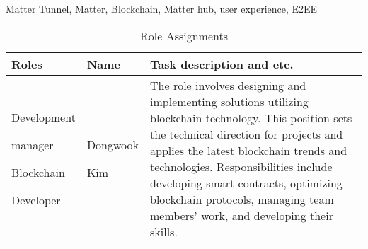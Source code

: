 \documentclass[conference]{IEEEtran}
\begin{document}
\begin{IEEEkeywords}
	Matter Tunnel, Matter, Blockchain, Matter hub, user experience, E2EE
\end{IEEEkeywords}

\begin{table}[h]
	\caption{Role Assignments}
	\def\arraystretch{1.24} \small
	\begin{tabular}{|p{1.8cm}|p{1.4cm}|p{4.4cm}|}
		\hline
		Roles                                                   & Name              & Task description and etc.                                                                                                                                                                                                                                                                                                                                  \\ \hline
		         
		Development \par manager \par Blockchain \par Developer & Dongwook \par Kim & The role involves designing and implementing solutions utilizing blockchain technology. This position sets the technical direction for projects and applies the latest blockchain trends and technologies. Responsibilities include developing smart contracts, optimizing blockchain protocols, managing team members' work, and developing their skills. \\ \hline
		        
	\end{tabular}
\end{table}

\needspace{10cm}
\end{document}
